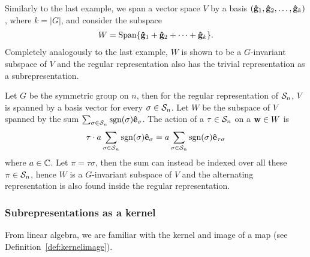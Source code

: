 \begin{example}\cite[Example 1.4.4.]{Sagan}
	Similarly to the last example, we span a vector space $V$ by a basis $(\mathbf{\hat{g}}_1, \mathbf{\hat{g}}_2, \dots, \mathbf{\hat{g}}_{k})$, where $k = |G|$, and consider the subspace 
	\begin{align*}
		W = \text{Span}\{ \mathbf{\hat{g}}_1 + \mathbf{\hat{g}}_2 + \dots + \mathbf{\hat{g}}_k \}. 
	\end{align*}
	Completely analogously to the last example, $W$ is shown to be a $G$-invariant subspace of $V$ and the regular representation also has the trivial representation as a subrepresentation.
\end{example}

\begin{example}\cite[Example 1.4.4.]{Sagan}
	Let $G$ be the symmetric group on $n$, then for the regular representation of $\mathcal{S}_n$, $V$ is spanned by a basis vector for every $\sigma \in \mathcal{S}_n$. Let $W$ be the subspace of $V$ spanned by the sum $\sum_{\sigma \in \mathcal{S}_n} \text{sgn}(\sigma) \mathbf{\hat{e}}_{\sigma}$. The action of a $\tau \in \mathcal{S}_n$ on a $\mathbf{w} \in W$ is
	\begin{align*}
		\tau \cdot a\sum_{\sigma \in \mathcal{S}_n} \text{sgn}(\sigma) \mathbf{\hat{e}}_{\sigma} = a \sum_{\sigma \in \mathcal{S}_n} \text{sgn}(\sigma) \mathbf{\hat{e}}_{\tau\sigma} 
	\end{align*}
	where $a \in \mathbb{C}$. Let $\pi = \tau\sigma$, then the sum can instead be indexed over all these $\pi \in \mathcal{S}_n$, hence $W$ is a $G$-invariant subspace of $V$ and the alternating representation is also found inside the regular representation.
\end{example}

\subsubsection{Subrepresentations as a kernel}

From linear algebra, we are familiar with the kernel and image of a map (see Definition~\ref{def:kernelimage}).

